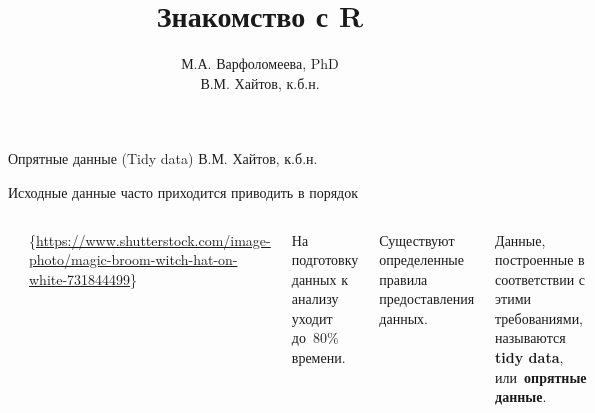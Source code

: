 \documentclass[
  10pt,
  ignorenonframetext,
  aspectratio=169,t,xcolor=table]{beamer}
\title{Знакомство с R}
\author{М.А. Варфоломеева, PhD\\
В.М. Хайтов, к.б.н.}
\date{}
\newcommand{\columnsbegin}{\vspace{-0.5\baselineskip}\begin{columns}[t,onlytextwidth]}
\newcommand{\columnsend}{\end{columns}}
\begin{document}
\frame{\titlepage}

\begin{frame}{Опрятные данные (Tidy data)}
\protect\hypertarget{ux43eux43fux440ux44fux442ux43dux44bux435-ux434ux430ux43dux43dux44bux435-tidy-data}{}
В.М. Хайтов, к.б.н.
\end{frame}

\begin{frame}{Исходные данные часто приходится приводить в порядок}
\protect\hypertarget{ux438ux441ux445ux43eux434ux43dux44bux435-ux434ux430ux43dux43dux44bux435-ux447ux430ux441ux442ux43e-ux43fux440ux438ux445ux43eux434ux438ux442ux441ux44f-ux43fux440ux438ux432ux43eux434ux438ux442ux44c-ux432-ux43fux43eux440ux44fux434ux43eux43a}{}
\columnsbegin
{}

\includegraphics[clip, trim=10mm 0mm 0mm 20mm, width=\textwidth, height=0.7\textheight,keepaspectratio]{images/stock-photo-magic-broom-and-witch-hat-on-a-white-background-731844499.jpg}

\tiny\{\url{https://www.shutterstock.com/image-photo/magic-broom-witch-hat-on-white-731844499}\}


На подготовку данных к анализу уходит до~80\% времени.

Существуют определенные правила предоставления данных.

Данные, построенные в соответствии с этими требованиями, называются
\textbf{tidy data}, или~\textbf{опрятные данные}.

\columnsend
\end{frame}
\end{document}
